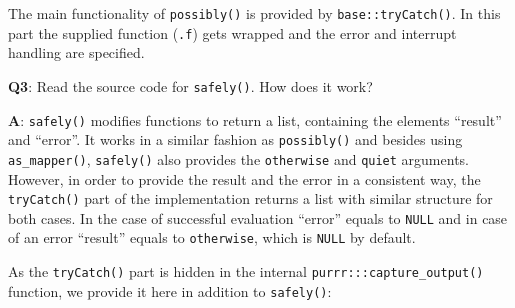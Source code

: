 \documentclass[
]{krantz}
\makeatletter
\newenvironment{Shaded}{\begin{snugshade}}{\end{snugshade}}
\newcommand{\CommentTok}[1]{\textcolor[rgb]{0.56,0.35,0.01}{\textit{#1}}}
\newcommand{\NormalTok}[1]{#1}
\newenvironment{kframe}{%
\medskip{}
\setlength{\fboxsep}{.8em}
 \def\at@end@of@kframe{}%
 \ifinner\ifhmode%
  \def\at@end@of@kframe{\end{minipage}}%
  \begin{minipage}{\columnwidth}%
 \fi\fi%
 \def\FrameCommand##1{\hskip\@totalleftmargin \hskip-\fboxsep
 \colorbox{shadecolor}{##1}\hskip-\fboxsep
     \hskip-\linewidth \hskip-\@totalleftmargin \hskip\columnwidth}%
 \MakeFramed {\advance\hsize-\width
   \@totalleftmargin\z@ \linewidth\hsize
   \@setminipage}}%
 {\par\unskip\endMakeFramed%
 \at@end@of@kframe}
\renewenvironment{Shaded}{\begin{kframe}}{\end{kframe}}
\renewcommand{\CommentTok} [1]{\textcolor[rgb]{0.38,0.63,0.69}{{#1}}}
\renewcommand{\NormalTok}  [1]{{#1}}
\makeatother
\begin{document}
\begin{Shaded}
\end{Shaded}

The main functionality of \texttt{possibly()} is provided by \texttt{base::tryCatch()}. In this part the supplied function (\texttt{.f}) gets wrapped and the error and interrupt handling are specified.

\textbf{{Q3}}: Read the source code for \texttt{safely()}. How does it work?

\textbf{{A}}: \texttt{safely()} modifies functions to return a list, containing the elements ``result'' and ``error''. It works in a similar fashion as \texttt{possibly()} and besides using \texttt{as\_mapper()}, \texttt{safely()} also provides the \texttt{otherwise} and \texttt{quiet} arguments. However, in order to provide the result and the error in a consistent way, the \texttt{tryCatch()} part of the implementation returns a list with similar structure for both cases. In the case of successful evaluation ``error'' equals to \texttt{NULL} and in case of an error ``result'' equals to \texttt{otherwise}, which is \texttt{NULL} by default.

As the \texttt{tryCatch()} part is hidden in the internal \texttt{purrr:::capture\_output()} function, we provide it here in addition to \texttt{safely()}:
\end{document}
